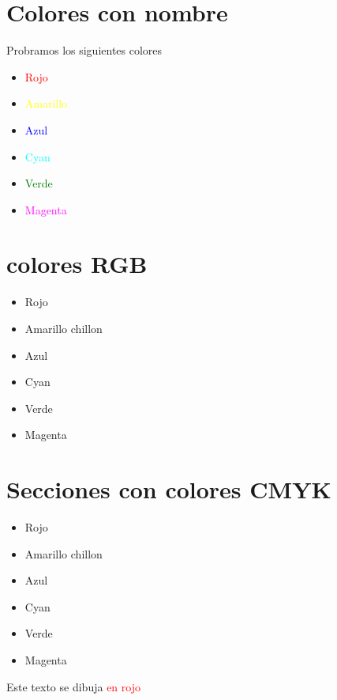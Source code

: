 \documentclass[10pt,a4paper]{article}
\begin{document}
 \section{Colores con nombre}
 Probramos los siguientes colores
  \begin{itemize}
 	 \item \textcolor{red}{Rojo}
 	 \item \textcolor{yellow}{Amarillo}
 	 \item \textcolor{blue}{Azul}
 	 \item \textcolor{cyan}{Cyan}
 	 \item \textcolor{green}{Verde}
 	 \item \textcolor{magenta}{Magenta}
  \end{itemize}
  
	\section{colores RGB}
	
	\begin{itemize}
	
	\item \textcolor[rgb]{1,0,0}{Rojo}
 	 \item \textcolor[rgb]{0.7,0.7,0}{Amarillo chillon}
 	 \item \textcolor[rgb]{0,0,1}{Azul}
 	 \item \textcolor[rgb]{0,1,1}{Cyan}
 	 \item \textcolor[rgb]{0,1,0}{Verde}
 	 \item \textcolor[rgb]{1,0,1}{Magenta}
	\end{itemize}
	
	\section{Secciones con colores CMYK}
	
	\begin{itemize}
	
	\item \textcolor[cmyk]{0,1,1,0}{Rojo}
 	 \item \textcolor[cmyk]{0,0,1,0}{Amarillo chillon}
 	 \item \textcolor[cmyk]{1,1,0,0}{Azul}
 	 \item \textcolor[cmyk]{1,0,0,0}{Cyan}
 	 \item \textcolor[cmyk]{1,0,1,0}{Verde}
 	 \item \textcolor[cmyk]{0,1,0,0}{Magenta}
	
	\end{itemize}
  
 Este texto se dibuja \textcolor{red}{en rojo}
\end{document}
